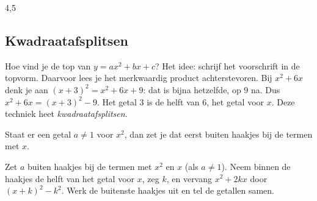 \begin{alleenvoor}{4,5}
\subsection{Kwadraatafsplitsen}

Hoe vind je de top van $y = ax^2 + bx + c$? Het idee: schrijf het voorschrift in de topvorm. Daarvoor lees je het merkwaardig product achterstevoren. Bij $x^2 + 6x$ denk je aan $(x + 3)^2 = x^2 + 6x + 9$: dat is bijna hetzelfde, op $9$ na. Dus $x^2 + 6x = (x + 3)^2 - 9$. Het getal $3$ is de helft van $6$, het getal voor $x$. Deze techniek heet \textit{kwadraatafsplitsen}.


Staat er een getal $a \neq 1$ voor $x^2$, dan zet je dat eerst buiten haakjes bij de termen met $x$.


\begin{werkwijze}
Zet $a$ buiten haakjes bij de termen met $x^2$ en $x$ (als $a \neq 1$). Neem binnen de haakjes de helft van het getal voor $x$, zeg $k$, en vervang $x^2 + 2kx$ door $(x + k)^2 - k^2$. Werk de buitenste haakjes uit en tel de getallen samen.
\end{werkwijze}

\begin{oefeningen}
\end{oefeningen}


\end{alleenvoor}
